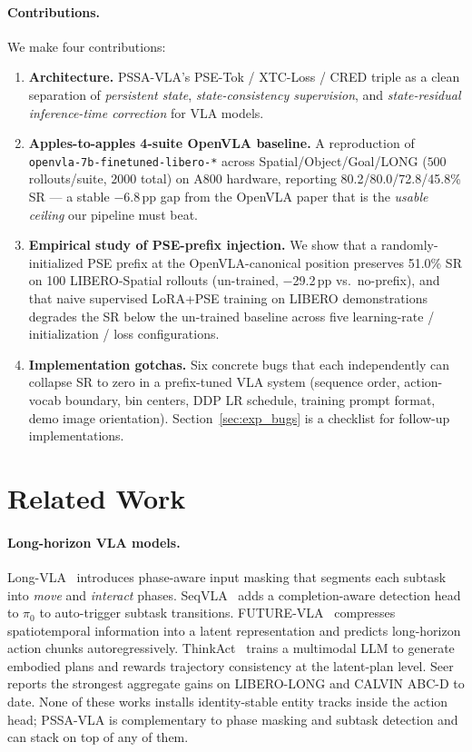 \documentclass[10pt,letterpaper]{article}
\newcommand{\method}{\textsc{PSSA-VLA}\xspace}
\begin{document}
\paragraph{Contributions.} We make four contributions:
\begin{enumerate}
  \item \textbf{Architecture.} \method's PSE-Tok / XTC-Loss / CRED
        triple as a clean separation of \emph{persistent state},
        \emph{state-consistency supervision}, and \emph{state-residual
        inference-time correction} for VLA models.
  \item \textbf{Apples-to-apples 4-suite OpenVLA baseline.} A
        reproduction of \texttt{openvla-7b-finetuned-libero-*} across
        Spatial/Object/Goal/LONG ($500$ rollouts/suite, $2000$ total) on
        A800 hardware, reporting 80.2/80.0/72.8/45.8\% SR --- a stable
        $-$6.8\,pp gap from the OpenVLA paper that is the
        \emph{usable ceiling} our pipeline must beat.
  \item \textbf{Empirical study of PSE-prefix injection.} We show that
        a randomly-initialized PSE prefix at the OpenVLA-canonical
        position preserves 51.0\% SR on 100 LIBERO-Spatial rollouts
        (un-trained, $-$29.2\,pp vs.\ no-prefix), and that naive
        supervised LoRA+PSE training on LIBERO demonstrations degrades
        the SR below the un-trained baseline across five
        learning-rate / initialization / loss configurations.
  \item \textbf{Implementation gotchas.} Six concrete bugs that each
        independently can collapse SR to zero in a prefix-tuned VLA
        system (sequence order, action-vocab boundary, bin centers,
        DDP LR schedule, training prompt format, demo image
        orientation). Section~\ref{sec:exp_bugs} is a checklist for
        follow-up implementations.
\end{enumerate}

\section{Related Work}\label{sec:related}

\paragraph{Long-horizon VLA models.}
Long-VLA~\cite{longvla} introduces phase-aware input masking that
segments each subtask into \textit{move} and \textit{interact} phases.
SeqVLA~\cite{seqvla} adds a completion-aware detection head to $\pi_0$
to auto-trigger subtask transitions. FUTURE-VLA~\cite{futurevla}
compresses spatiotemporal information into a latent representation and
predicts long-horizon action chunks autoregressively. ThinkAct~\cite{thinkact}
trains a multimodal LLM to generate embodied plans and rewards
trajectory consistency at the latent-plan level. Seer~\cite{seer}
reports the strongest aggregate gains on LIBERO-LONG and CALVIN ABC-D
to date. None of these works installs identity-stable entity tracks
inside the action head; \method is complementary to phase masking and
subtask detection and can stack on top of any of them.
\end{document}
